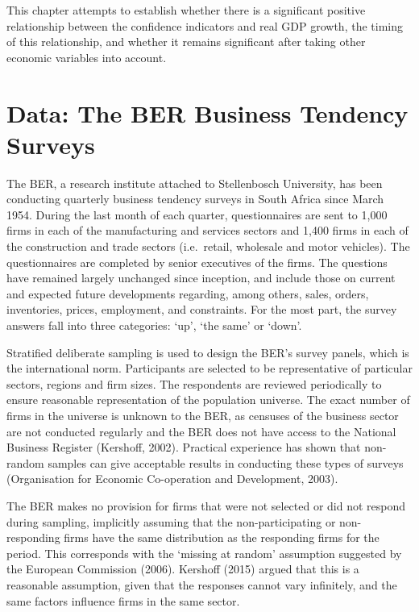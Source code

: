 \documentclass[11pt,]{article}
\begin{document}
This chapter attempts to establish whether there is a significant
positive relationship between the confidence indicators and real GDP
growth, the timing of this relationship, and whether it remains
significant after taking other economic variables into account.

\section{Data: The BER Business Tendency
Surveys}\label{data-the-ber-business-tendency-surveys}

The BER, a research institute attached to Stellenbosch University, has
been conducting quarterly business tendency surveys in South Africa
since March 1954. During the last month of each quarter, questionnaires
are sent to 1,000 firms in each of the manufacturing and services
sectors and 1,400 firms in each of the construction and trade sectors
(i.e.~retail, wholesale and motor vehicles). The questionnaires are
completed by senior executives of the firms. The questions have remained
largely unchanged since inception, and include those on current and
expected future developments regarding, among others, sales, orders,
inventories, prices, employment, and constraints. For the most part, the
survey answers fall into three categories: `up', `the same' or `down'.

Stratified deliberate sampling is used to design the BER's survey
panels, which is the international norm. Participants are selected to be
representative of particular sectors, regions and firm sizes. The
respondents are reviewed periodically to ensure reasonable
representation of the population universe. The exact number of firms in
the universe is unknown to the BER, as censuses of the business sector
are not conducted regularly and the BER does not have access to the
National Business Register (Kershoff, 2002). Practical experience has
shown that non-random samples can give acceptable results in conducting
these types of surveys (Organisation for Economic Co-operation and
Development, 2003).

The BER makes no provision for firms that were not selected or did not
respond during sampling, implicitly assuming that the non-participating
or non-responding firms have the same distribution as the responding
firms for the period. This corresponds with the `missing at random'
assumption suggested by the European Commission (2006). Kershoff (2015)
argued that this is a reasonable assumption, given that the responses
cannot vary infinitely, and the same factors influence firms in the same
sector.
\end{document}
